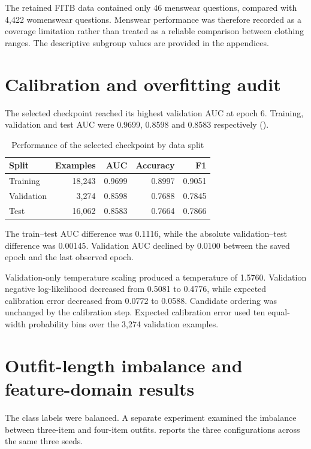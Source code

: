 The retained FITB data contained only 46 menswear questions, compared with
4,422 womenswear questions. Menswear performance was therefore recorded as a
coverage limitation rather than treated as a reliable comparison between
clothing ranges. The descriptive subgroup values are provided in the
appendices.

\section{Calibration and overfitting audit}

The selected checkpoint reached its highest validation AUC at epoch 6. Training,
validation and test AUC were 0.9699, 0.8598 and 0.8583 respectively
().

\begin{table}[htbp]
  \centering
  \caption{Performance of the selected checkpoint by data split}
  \label{tab:split-results}
  \begin{tabular}{lrrrr}
    \toprule
    Split & Examples & AUC & Accuracy & F1 \\
    \midrule
    Training & 18,243 & 0.9699 & 0.8997 & 0.9051 \\
    Validation & 3,274 & 0.8598 & 0.7688 & 0.7845 \\
    Test & 16,062 & 0.8583 & 0.7664 & 0.7866 \\
    \bottomrule
  \end{tabular}
\end{table}

The train--test AUC difference was 0.1116, while the absolute
validation--test difference was 0.00145. Validation AUC declined by 0.0100
between the saved epoch and the last observed epoch.

Validation-only temperature scaling produced a temperature of 1.5760.
Validation negative log-likelihood decreased from 0.5081 to 0.4776, while
expected calibration error decreased from 0.0772 to 0.0588. Candidate ordering
was unchanged by the calibration step. Expected calibration error used ten
equal-width probability bins over the 3,274 validation examples.

\section{Outfit-length imbalance and feature-domain results}

The class labels were balanced. A separate experiment examined the imbalance
between three-item and four-item outfits. 
reports the three configurations across the same three seeds.

